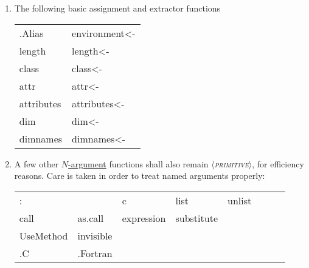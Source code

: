 \documentclass[11pt,a4paper]{article}
\renewcommand{\^}{\code{\char'136}}
\renewcommand{\~}{\code{\char'176}}
\newcommand{\primfun}{{\normalfont\slshape\scshape$\langle$primitive$\rangle$}}
\begin{document}
\begin{enumerate}
\item The following basic assignment and extractor functions
  \begin{center}\ttfamily
    \begin{tabular}{ll}
      .Alias & environment<- \\
      length & length<- \\
      class  & class<-  \\
        attr & attr<- \\
   attributes& attributes<- \\
      dim    & dim<- \\
    dimnames & dimnames<- \\
    \end{tabular}
  \end{center}

\item A few other \underline{$N$-argument} functions shall also remain
  \primfun, for efficiency reasons.
  Care is taken in order to treat named arguments properly:
  \begin{center}\ttfamily
    \begin{tabular}{*{8}{l}}
      :    & \~ & c & list & unlist \\
      call & as.call & expression & substitute \\
      UseMethod & invisible \\
      .C & .Fortran
    \end{tabular}
  \end{center}

\end{enumerate}
\end{document}
